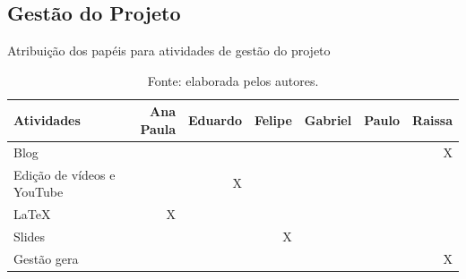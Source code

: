     
    \subsection{Gestão do Projeto}
        \begin{table}[!ht]    
            \captionsetup{width=1.0\textwidth} %
            \caption{Atribuição dos papéis para atividades de gestão do projeto}    
            \begin{tabular}{lrrrrrr}
                \toprule
                Atividades & Ana Paula & Eduardo & Felipe & Gabriel & Paulo & Raissa \\
                \midrule
                Blog                                &   &   &   &   &   & X \\
                Edição de vídeos e YouTube          &   & X &   &   &   &   \\
                LaTeX                               & X &   &   &   &   &   \\
                Slides                              &   &   & X &   &   &   \\
                Gestão gera                         &   &   &   &   &   & X \\
                \bottomrule
            \end{tabular}
            \caption*{Fonte: elaborada pelos autores.} %
        \end{table}
